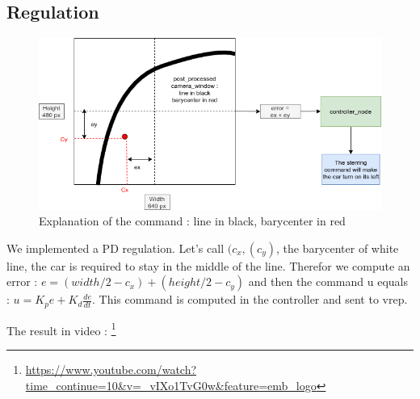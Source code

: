 \subsection{Regulation}
\begin{figure}[ht!]
    \begin{center}
        \includegraphics[scale=0.5]{Images/command_explanation.png}
    \end{center}
    \caption{Explanation of the command : line in black, barycenter in red}
    \label{fig:command_explanation}

\end{figure}
We implemented a PD regulation. Let's call $(c_x, (c_y)$, the barycenter of white line, the car is required to stay in the middle of the line.
Therefor we compute an error : $e = (width/2 - c_x) + (height/2 - c_y)$ and then the command u equals : 
$u = K_p e + K_d \frac{de}{dt}$. This command is computed in the controller and sent to vrep.


The result in video : \footnote{\url{https://www.youtube.com/watch?time_continue=10&v=_vIXo1TvG0w&feature=emb_logo}}  




